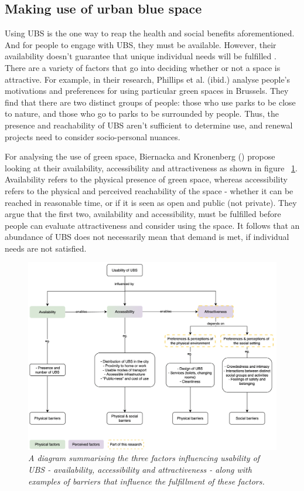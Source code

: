 \documentclass{article}
\begin{document}
\subsection{Making use of urban blue space}

Using UBS is the one way to reap the health and social benefits aforementioned. And for people to engage with UBS, they must be available. However, their availability doesn't guarantee that unique individual needs will be fulfilled \parencite{phillips2021use}. There are a variety of factors that go into deciding whether or not a space is attractive. For example, in their research, Phillips et al. (ibid.) analyse people's motivations and preferences for using particular green spaces in Brussels. They find that there are two distinct groups of people: those who use parks to be close to nature, and those who go to parks to be surrounded by people. Thus, the presence and reachability of UBS aren't sufficient to determine use, and renewal projects need to consider socio-personal nuances.

For analysing the use of green space, Biernacka and Kronenberg (\citeyear{biernacka2018classification}) propose looking at their availability, accessibility and attractiveness as shown in figure ~\ref{fig:diagram_ubs_use}.
Availability refers to the physical presence of green space, whereas accessibility refers to the physical and perceived reachability of the space - whether it can be reached in reasonable time, or if it is seen as open and public (not private). 
They argue that the first two, availability and accessibility, must be fulfilled before people can evaluate attractiveness and consider using the space. 
It follows that an abundance of UBS does not necessarily mean that demand is met, if individual needs are not satisfied.

\begin{figure}[h]
	\includegraphics[width=\textwidth]{diagram_ubs_use.png}
	\caption{\textit{A diagram summarising the three factors influencing usability of UBS - availability, accessibility and attractiveness - along with examples of barriers that influence the fulfillment of these factors.}}
	  \label{fig:diagram_ubs_use}
\end{figure}
\end{document}
